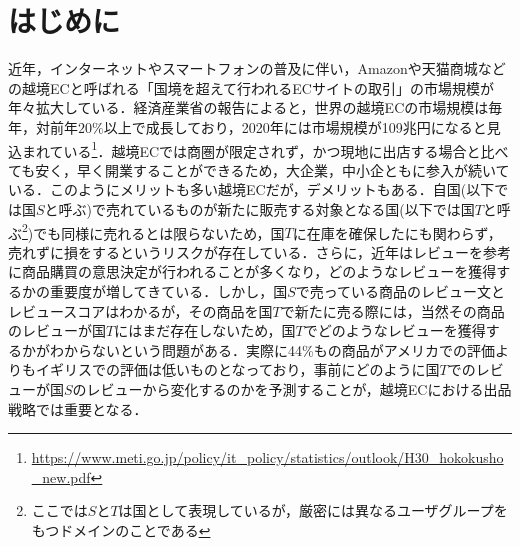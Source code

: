 \documentclass[dvipdfmx,twocolumn,10.5pt]{jsarticle}
\begin{document}
\section{はじめに}
近年，インターネットやスマートフォンの普及に伴い，Amazonや天猫商城などの越境ECと呼ばれる「国境を超えて行われるECサイトの取引」の市場規模が年々拡大している．経済産業省の報告によると，世界の越境ECの市場規模は毎年，対前年$20\%$以上で成長しており，2020年には市場規模が109兆円になると見込まれている\footnote{\url{https://www.meti.go.jp/policy/it_policy/statistics/outlook/H30_hokokusho_new.pdf}}．越境ECでは商圏が限定されず，かつ現地に出店する場合と比べても安く，早く開業することができるため，大企業，中小企ともに参入が続いている．このようにメリットも多い越境ECだが，デメリットもある．自国(以下では国$S$と呼ぶ)で売れているものが新たに販売する対象となる国(以下では国$T$と呼ぶ\footnote{ここでは$S$と$T$は国として表現しているが，厳密には異なるユーザグループをもつドメインのことである})でも同様に売れるとは限らないため，国$T$に在庫を確保したにも関わらず，売れずに損をするというリスクが存在している．さらに，近年はレビューを参考に商品購買の意思決定が行われることが多くなり，どのようなレビューを獲得するかの重要度が増してきている．しかし，国$S$で売っている商品のレビュー文とレビュースコアはわかるが，その商品を国$T$で新たに売る際には，当然その商品のレビューが国$T$にはまだ存在しないため，国$T$でどのようなレビューを獲得するかがわからないという問題がある．実際に44\%もの商品がアメリカでの評価よりもイギリスでの評価は低いものとなっており，事前にどのように国$T$でのレビューが国$S$のレビューから変化するのかを予測することが，越境ECにおける出品戦略では重要となる．
\end{document}
